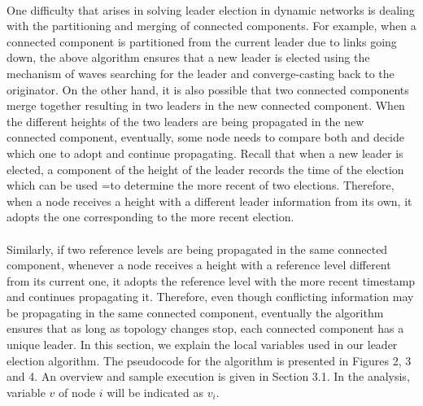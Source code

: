 \documentclass{article}
\begin{document}
\paragraph{}One difficulty that arises in solving leader election in dynamic networks is dealing with the partitioning and merging of connected components. For example, when a connected component is partitioned from the current leader due to links going down, the above algorithm ensures that a new leader is elected using the mechanism of waves searching for the leader and converge-casting back to the originator. On the other hand, it is also possible that two connected components merge together resulting in two leaders in the new connected component. When the different heights of the two leaders are being propagated in the new connected component, eventually, some node needs to compare both and decide which one to adopt and continue propagating. Recall that when a new leader is elected, a component of the height of the leader records the time of the election which can be used =to determine the more recent of two elections. Therefore, when a node receives a height with a different leader information from its own, it adopts the one corresponding to the more recent election.
\paragraph{}Similarly, if two reference levels are being propagated in the same connected component, whenever a node receives a height with a reference level different from its current one, it adopts the reference level with the more recent timestamp and continues propagating it. Therefore, even though conflicting information may be propagating in the same connected component, eventually the algorithm ensures that as long as topology changes stop, each connected component has a unique leader.
\newpage
In this section, we explain the local variables used in our leader election algorithm. The pseudocode for the algorithm is presented in Figures 2, 3 and 4. An overview and sample execution is given in Section 3.1. In the analysis, variable $v$ of node $i$ will be indicated as $v_i$.
\end{document}
